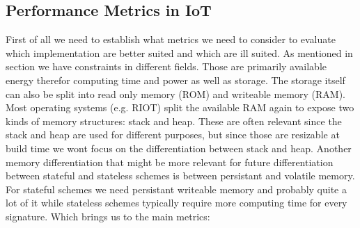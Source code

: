 \documentclass[conference]{IEEEtran}
\newcommand{\comment}[1]{}
\begin{document}
\subsection{Performance Metrics in IoT}
\comment{ %
- key/ exchange message/ signature size 
- cache/ ram usage

- setup(ms)  lifetime, pubk size, privk size, sig

'' small sized public key, small digital 
signature and a range of supported hash output sizes is 
recommended''\cite{QR_Iot_Lattice}

- Stateful/less
- „signature and/or key sizes to running times and memory consumption to energy consumption „
- „From the software benchmark perspec- tive, the runtime of key generation, signing, and verification processes whereas from the hardware perspective, CPU cycles, key size, signature size, and energy consumption are among the targeted evaluation metrics. In general, the parameter sets are highly dependent on the underlying construction of a particular scheme.“
\cite{QR_sigs}

- most impls have quite large keys \cite{QR_comparison}
- key gen performance since many schemes have limited signatures \cite{QR_comparison}

- IoT evolves, when fast quantum is available iot will be better too  \cite{QR_comparison}
} %
First of all we need to establish what metrics we need to consider to evaluate which implementation are better suited and which are ill suited.
As mentioned in section \label{bg:iot} we have constraints in different fields. Those are primarily available energy therefor computing time and power as well as storage.
The storage itself can also be split into read only memory (ROM) and writeable memory (RAM).
Most operating systems (e.g. RIOT) split the available RAM again to expose two kinds of memory structures: stack and heap. These are often relevant since the stack and heap are used for different purposes, but since those are resizable at build time we wont focus on the differentiation between stack and heap.
Another memory differentiation that might be more relevant for future differentiation between stateful and stateless schemes is between persistant and volatile memory. 
For stateful schemes we need persistant writeable memory and probably quite a lot of it while stateless schemes typically require more computing time for every signature. Which brings us to the main metrics:
\end{document}
